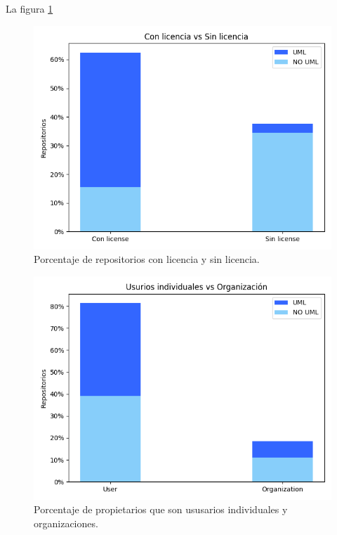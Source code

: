\documentclass[a4paper, 12pt]{book}
\begin{document}
La figura \ref{fig:Figure_license} 
\begin{figure}
  \centering
  \includegraphics[width=12cm, keepaspectratio]{img/Figure_license.png}
  \caption{Porcentaje de repositorios con licencia y sin licencia.}\label{fig:Figure_license}
\end{figure}



\begin{figure}
  \centering
  \includegraphics[width=12cm, keepaspectratio]{img/Figure_typeDeveloper.png}
  \caption{Porcentaje de propietarios que son ususarios individuales y organizaciones.}\label{fig:Figure_typeDeveloper}
\end{figure}
\end{document}
